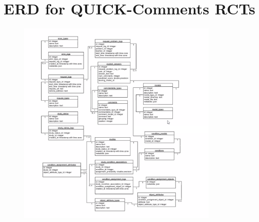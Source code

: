 \documentclass[12pt]{report}
\begin{document}





\appendix


\chapter{ERD for QUICK-Comments RCTs}
\begin{figure}[ht] 
    \centering
    \includegraphics[width=0.85\textwidth]{images/erd.png}
    \label{img:erd}
\end{figure}




%
%
\end{document}
